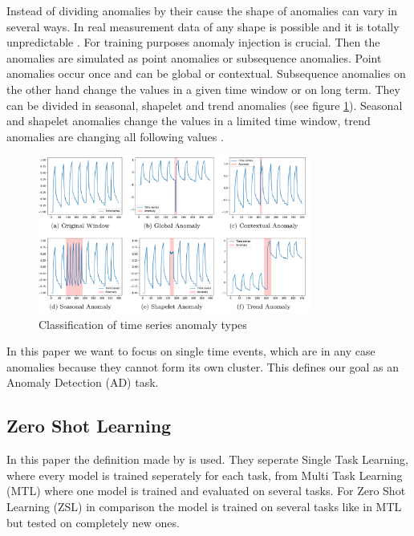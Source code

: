 Instead of dividing anomalies by their cause the shape of anomalies can vary in several ways. In real measurement data of any shape is possible and it is totally unpredictable \cite{schwartz_maeday_2024}. For training purposes anomaly injection is crucial. Then the anomalies are simulated as point anomalies or subsequence anomalies. Point anomalies occur once and can be global or contextual. Subsequence anomalies on the other hand change the values in a given time window or on long term. They can be divided in seasonal, shapelet and trend anomalies (see figure \ref{fig_anomaly_carla}). Seasonal and shapelet anomalies change the values in a limited time window, trend anomalies are changing all following values \cite[p. 9]{darban_carla_2024}. %
\begin{figure}[h!] %
  \centering
  \includegraphics[width=0.8\textwidth]{images/carla_anomalies.png}
  \caption{Classification of time series anomaly types \cite{darban_carla_2024}}
  \label{fig_anomaly_carla}
\end{figure}

In this paper we want to focus on single time events, which are in any case anomalies because they cannot form its own cluster. This defines our goal as an Anomaly Detection (AD) task.

\subsection{Zero Shot Learning}
In this paper the definition made by \cite{nivarthi_unified_2022} is used. They seperate Single Task Learning, where every model is trained seperately for each task, from Multi Task Learning (MTL) where one model is trained and evaluated on several tasks. For Zero Shot Learning (ZSL) in comparison the model is trained on several tasks like in MTL but tested on completely new ones.

